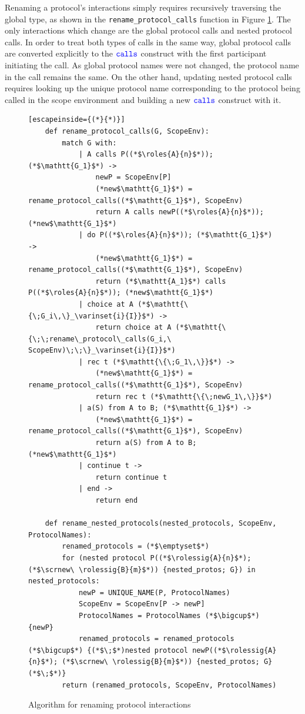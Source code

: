 \documentclass[12pt,twoside]{report}
\begin{document}
Renaming a protocol's interactions simply requires recursively traversing the global type, as shown in the \texttt{rename\_protocol\_calls} function in Figure \ref{renaming-interactions}. The only interactions which change are the global protocol calls and nested protocol calls. In order to treat both types of calls in the same way, global protocol calls are converted explicitly to the ${\color{blue}\mathtt{calls}}$ construct with the first participant initiating the call. As global protocol names were not changed, the protocol name in the call remains the same. On the other hand, updating nested protocol calls requires looking up the unique protocol name corresponding to the protocol being called in the scope environment and building a new ${\color{blue}\mathtt{calls}}$ construct with it.\\

\begin{figure}[h!]
    \centering
    \lstset{language=Pseudocode}
    \begin{lstlisting}[escapeinside={(*}{*)}]
    def rename_protocol_calls(G, ScopeEnv):
        match G with:
            | A calls P((*$\roles{A}{n}$*)); (*$\mathtt{G_1}$*) ->
                newP = ScopeEnv[P]
                (*new$\mathtt{G_1}$*) = rename_protocol_calls((*$\mathtt{G_1}$*), ScopeEnv)
                return A calls newP((*$\roles{A}{n}$*)); (*new$\mathtt{G_1}$*)
            | do P((*$\roles{A}{n}$*)); (*$\mathtt{G_1}$*) -> 
                (*new$\mathtt{G_1}$*) = rename_protocol_calls((*$\mathtt{G_1}$*), ScopeEnv)
                return (*$\mathtt{A_1}$*) calls P((*$\roles{A}{n}$*)); (*new$\mathtt{G_1}$*)
            | choice at A (*$\mathtt{\{\;G_i\,\}_\varinset{i}{I}}$*) ->
                return choice at A (*$\mathtt{\{\;\;rename\_protocol\_calls(G_i,\ ScopeEnv)\;\;\}_\varinset{i}{I}}$*)
            | rec t (*$\mathtt{\{\;G_1\,\}}$*) -> 
                (*new$\mathtt{G_1}$*) = rename_protocol_calls((*$\mathtt{G_1}$*), ScopeEnv)
                return rec t (*$\mathtt{\{\;newG_1\,\}}$*)
            | a(S) from A to B; (*$\mathtt{G_1}$*) ->
                (*new$\mathtt{G_1}$*) = rename_protocol_calls((*$\mathtt{G_1}$*), ScopeEnv)
                return a(S) from A to B; (*new$\mathtt{G_1}$*)
            | continue t ->
                return continue t
            | end ->
                return end
        
    def rename_nested_protocols(nested_protocols, ScopeEnv, ProtocolNames):
        renamed_protocols = (*$\emptyset$*)
        for (nested protocol P((*$\rolessig{A}{n}$*); (*$\scrnew\ \rolessig{B}{m}$*)) {nested_protos; G}) in nested_protocols:
            newP = UNIQUE_NAME(P, ProtocolNames)
            ScopeEnv = ScopeEnv[P -> newP]
            ProtocolNames = ProtocolNames (*$\bigcup$*) {newP}
            renamed_protocols = renamed_protocols (*$\bigcup$*) {(*$\;$*)nested protocol newP((*$\rolessig{A}{n}$*); (*$\scrnew\ \rolessig{B}{m}$*)) {nested_protos; G}(*$\;$*)}
        return (renamed_protocols, ScopeEnv, ProtocolNames)
    \end{lstlisting}
    \caption{Algorithm for renaming protocol interactions}
    \label{renaming-interactions}
\end{figure}
\clearpage
\end{document}
